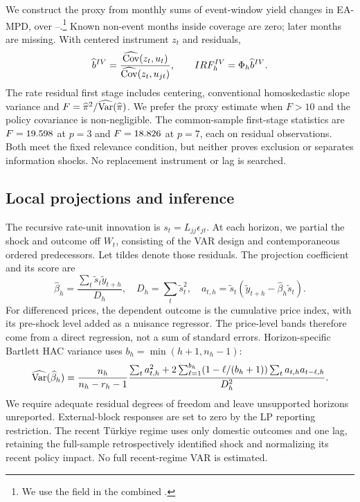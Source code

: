 We construct the proxy from monthly sums of event-window yield changes in EA-MPD, over \ProxyStart{}--\ProxyEnd{}.\footnote{We use the  field in the combined .} Known non-event months inside coverage are zero; later months are missing. With centered instrument $z_t$ and residuals,
\begin{equation}
 \widehat b^{IV}=\frac{\widehat{\operatorname{Cov}}(z_t, u_t)}{\widehat{\operatorname{Cov}}(z_t, u_{jt})},
 \qquad IRF_h^{IV}=\Phi_h\widehat b^{IV}.
\end{equation}
The rate residual first stage includes centering, conventional homoskedastic slope variance and $F=\widehat\pi^2/\widehat{\operatorname{Var}}(\widehat\pi)$. We prefer the proxy estimate when $F>10$ and the policy covariance is non-negligible. The common-sample first-stage statistics are $F=19.598{}$ at $p=3$ and $F=18.826{}$ at $p=7$, each on \ComparisonN{} residual observations. Both meet the fixed relevance condition, but neither proves exclusion or separates information shocks. No replacement instrument or lag is searched.
\subsection{Local projections and inference}
The recursive rate-unit innovation is $s_t=L_{jj}\epsilon_{jt}$. At each horizon, we partial the shock and outcome off $W_t$, consisting of the VAR design and contemporaneous ordered predecessors. Let tildes denote those residuals. The projection coefficient and its score are
\begin{equation}
 \widehat\beta_h=\frac{\sum_t\widetilde s_t\widetilde y_{t+h}}{D_h},\quad
 D_h=\sum_t\widetilde s_t^2,\quad a_{t, h}=\widetilde s_t(\widetilde y_{t+h}-\widehat\beta_h\widetilde s_t).
\end{equation}
For differenced prices, the dependent outcome is the cumulative price index, with its pre-shock level added as a nuisance regressor. The price-level bands therefore come from a direct regression, not a sum of standard errors. Horizon-specific Bartlett HAC variance uses $b_h=\min(h+1, n_h-1)$:
\begin{equation}
 \widehat{\operatorname{Var}}(\widehat\beta_h)=\frac{n_h}{n_h-r_h-1}\frac{\sum_t a_{t, h}^2+2\sum_{\ell=1}^{b_h}(1-\ell/(b_h+1))\sum_ta_{t, h}a_{t-\ell, h}}{D_h^2}.
\end{equation}
We require adequate residual degrees of freedom and leave unsupported horizons unreported. External-block responses are set to zero by the LP reporting restriction. The recent Türkiye regime uses only domestic outcomes and one lag, retaining the full-sample retrospectively identified shock and normalizing its recent policy impact. No full recent-regime VAR is estimated.

